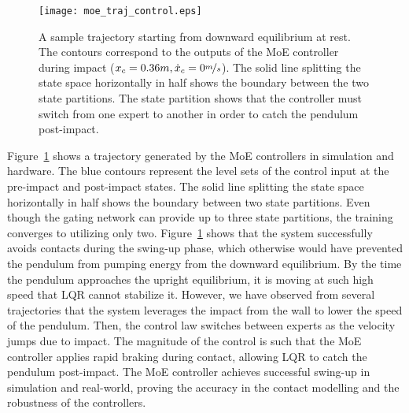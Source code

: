 \begin{figure}[tb]
    \centering
    \texttt{[image: moe\_traj\_control.eps]}
    \caption{A sample trajectory starting from downward equilibrium at rest.
    The contours correspond to the outputs of the MoE controller during impact
    ($x_c=0.36m, \dot{x}_c = 0\nicefrac{m}{s}$). The solid line
    splitting the state space horizontally in half shows the boundary between
    the two state partitions. The state partition shows that the controller must
    switch from one expert to another in order to catch the pendulum
    post-impact.}
    \label{fig:cartpole_trajectory}
\end{figure}

Figure~\ref{fig:cartpole_trajectory} shows a trajectory generated by the MoE
controllers in simulation and hardware.
%
The blue contours represent the level sets of the control input at the
pre-impact and post-impact states.
%
The solid line splitting the state space horizontally in half shows the boundary
between two state partitions.
%
Even though the gating network can provide up to three state partitions, the
training converges to utilizing only two.
%
Figure~\ref{fig:cartpole_trajectory} shows that the system successfully avoids
contacts during the swing-up phase, which otherwise would have prevented the
pendulum from pumping energy from the downward equilibrium.
%
By the time the pendulum approaches the upright equilibrium, it is moving at
such high speed that LQR cannot stabilize it.
%
However, we have observed from several trajectories that the system leverages
the impact from the wall to lower the speed of the pendulum.
%
Then, the control law switches between experts as the velocity jumps due to impact.
%
The magnitude of the control is such that the MoE controller applies rapid
braking during contact, allowing LQR to catch the pendulum post-impact.
%
The MoE controller achieves successful swing-up in simulation and real-world,
proving the accuracy in the contact modelling and the robustness of the
controllers.

